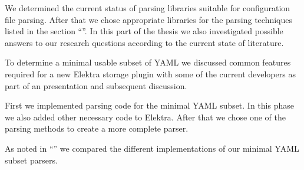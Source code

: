 \begin{description}[style=multiline, leftmargin=3.4cm, font=\bfseries]

  \item[Literature Review] We determined the current status of parsing libraries suitable for configuration file parsing. After that we chose appropriate libraries for the parsing techniques listed in the section “”. In this part of the thesis we also investigated possible answers to our research questions according to the current state of literature.

  \item[YAML Subset] To determine a minimal usable subset of YAML we discussed common features required for a new Elektra storage plugin with some of the current developers as part of an presentation and subsequent discussion.

  \item[Implementation] First we implemented parsing code for the minimal YAML subset. In this phase we also added other necessary code to Elektra. After that we chose one of the parsing methods to create a more complete  parser.

  \item[Comparison] As noted in “” we compared the different implementations of our minimal YAML subset parsers.

\end{description}
